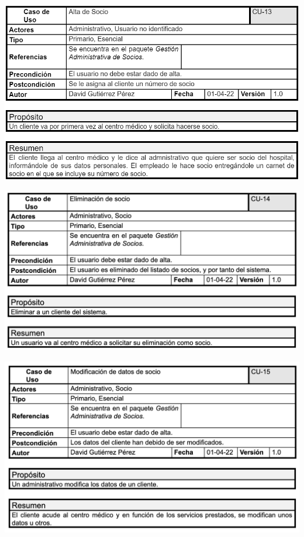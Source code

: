 \documentclass[12pt, spanish]{article}
\begin{document}
\begin{centering}\includegraphics[scale = 0.62]{casos_de_uso/13.png}\\[1.0 cm]\end{centering}
\begin{centering}\includegraphics[scale = 0.70]{casos_de_uso/14.png}\\[1.0 cm]\end{centering}
\begin{centering}\includegraphics[scale = 0.70]{casos_de_uso/15.png}\\[1.0 cm]\end{centering}
\end{document}
